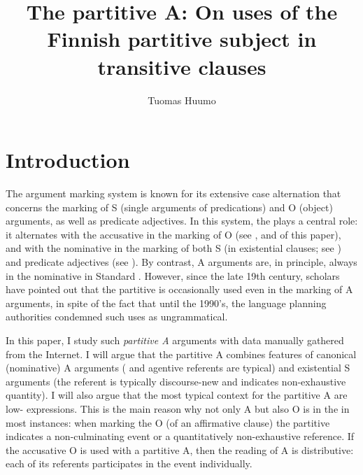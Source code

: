 \documentclass[output=paper]{LSP/langsci}
\author{Tuomas Huumo\affiliation{University of Turku, University of Tartu}}
\title{The partitive A: On uses of the Finnish partitive subject in transitive clauses}
\begin{document}
\section{Introduction}
\label{15-hu-sec:1}

The  argument marking system is known for its extensive case alternation that concerns the marking of S (single arguments of  predications) and O (object) arguments, as well as predicate adjectives. In this system, the  plays a central role: it alternates with the accusative in the marking of O (see \eg \citealt{Heinamaki1984Aspect,Heinamaki1994Aspect,Kiparsky1998Partitive,Huumo2010Nominal,Huumo2013incompleteness}, and  of this paper), and with the nominative in the marking of both S (in existential clauses; see \eg \citealt{Huumo2003Incremental}) and predicate adjectives (see \citealt{Huumo2009Fictive}). By contrast, A arguments are, in principle, always in the nominative in Standard . However, since the late 19th century, scholars have pointed out that the partitive is occasionally used even in the marking of A arguments, in spite of the fact that until the 1990’s, the  language planning authorities condemned such uses as ungrammatical.

In this paper, I study such \textit{partitive A} arguments with data manually gathered from the Internet. I will argue that the partitive A combines features of canonical (nominative) A arguments ( and agentive referents are typical) and existential S arguments (the referent is typically discourse-new and indicates non-exhaustive quantity).  I will also argue that the most typical context for the partitive A are low- expressions. This is the main reason why not only A but also O is in the  in most instances: when marking the O (of an affirmative clause) the partitive indicates a non-culminating event or a quantitatively non-exhaustive reference. If the accusative O is used with a partitive A, then the reading of A is distributive: each of its referents participates in the event individually. 
\end{document}
